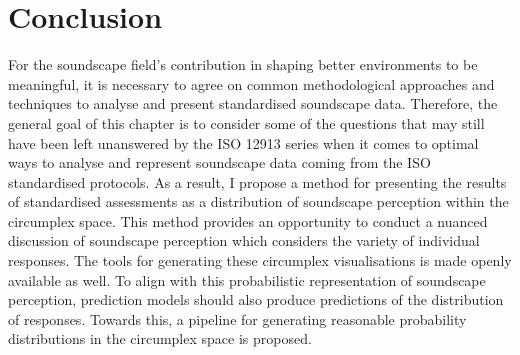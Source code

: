
\section{Conclusion}
For the soundscape field's contribution in shaping better environments to be meaningful, it is necessary to agree on common methodological approaches and techniques to analyse and present standardised soundscape data. Therefore, the general goal of this chapter is to consider some of the questions that may still have been left unanswered by the ISO 12913 series when it comes to optimal ways to analyse and represent soundscape data coming from the ISO standardised protocols. As a result, I propose a method for presenting the results of standardised assessments as a distribution of soundscape perception within the circumplex space. This method provides an opportunity to conduct a nuanced discussion of soundscape perception which considers the variety of individual responses. The tools for generating these circumplex visualisations is made openly available as well. To align with this probabilistic representation of soundscape perception, prediction models should also produce predictions of the distribution of responses. Towards this, a pipeline for generating reasonable probability distributions in the circumplex space is proposed.
